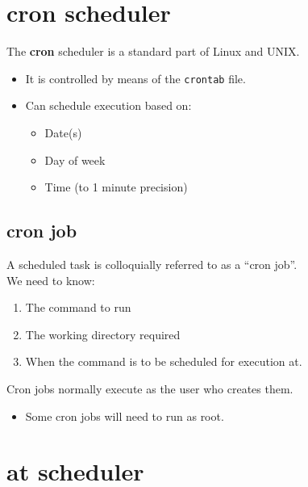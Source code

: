 \documentclass[slides]{pgnotes}
\begin{document}
\section{cron scheduler}

The \textbf{cron} scheduler is a standard part of Linux and UNIX.
\begin{itemize}
\item It is controlled by means of the \texttt{crontab} file.
\item Can schedule execution based on:
  \begin{itemize}
  \item Date(s)
  \item Day of week
  \item Time (to 1 minute precision)
  \end{itemize}
\end{itemize}

\subsection{cron job}

A scheduled task is colloquially referred to as a ``cron job''.\\
We need to know:
\begin{enumerate}
\item The command to run
\item The working directory required
\item When the command is to be scheduled for execution at.
\end{enumerate}
Cron jobs normally execute as the user who creates them.
\begin{itemize}
\item Some cron jobs will need to run as root.
\end{itemize}


\section{at scheduler}
\end{document}
